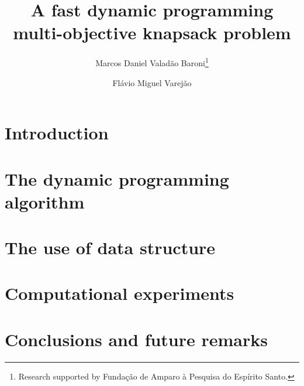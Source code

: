\documentclass{article}
\begin{document}
\title{A fast dynamic programming multi-objective knapsack problem}

\author{
   Marcos Daniel Valad\~ao Baroni\thanks{Research supported by Funda\c c\~ao de Amparo \`a Pesquisa do Esp\'irito Santo.}
   \and
   Fl\'avio Miguel Varej\~ao
}

\maketitle

\begin{abstract}

\end{abstract}

%
%

\section{Introduction}
\label{sec:intro}


\section{The dynamic programming algorithm}
\label{sec:dynprog}


\section{The use of data structure}
\label{sec:kdtree}


\section{Computational experiments}
\label{sec:exp}


\section{Conclusions and future remarks}
\label{sec:conc}


%

\end{document}
